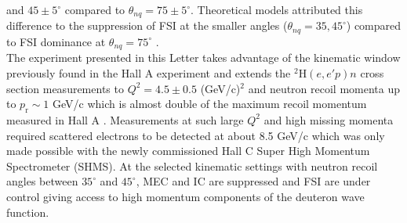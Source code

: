 and $45\pm5^{\circ}$ compared to  $\theta_{nq}=75\pm5^{\circ}$. Theoretical models attributed this difference  to the suppression of FSI at the smaller angles ($\theta_{nq}=35, 45^{\circ}$) compared to FSI
dominance at $\theta_{nq}=75^{\circ}$ \cite{PhysRevLett.107.262501}. \\
\indent The experiment presented in this Letter takes advantage of the kinematic window previously found in the Hall A experiment and extends the $^{2}\mathrm{H}(e,e'p)n$ cross section measurements
to $Q^{2}=4.5\pm0.5$ (GeV/c)$^{2}$ and neutron recoil momenta up to $p_{\mathrm{r}}\sim 1$ GeV/c which is almost double of the maximum recoil momentum measured in Hall A \cite{PhysRevLett.107.262501}.
Measurements at such large $Q^{2}$ and high missing momenta required scattered electrons to be detected at about 8.5 GeV/c which was only made possible with the newly commissioned Hall C Super High Momentum Spectrometer (SHMS).
At the selected kinematic settings with neutron recoil angles between $35^{\circ}$ and $45^{\circ}$, MEC and IC are suppressed and FSI are under control giving access to high momentum components of the deuteron wave function.


